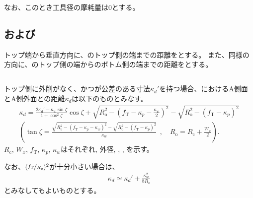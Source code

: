 なお、このとき工具径の摩耗量は0とする。


\subsection{\KeywayPos および\KeywayWidth}
トップ端から垂直方向に、\Keyway のトップ側の端までの距離を\KeywayPos とする。
また、同様の方向に、\Keyway のトップ側の端から\Keyway のボトム側の端までの距離を\KeywayWidth とする。


\subsection{\KeywayDepth}
トップ側に外削がなく、かつ\AsideKeywayDepth が公差のある寸法$\kappa_d'$を持つ場合、\KeywayCenter における\Keyway A側面とA側外面との距離$\kappa_d$は以下のものとみなす。
\begin{gather*}
  \kappa_d
  = \frac{2\kappa_d'-\kappa_w\sin\zeta}{1+\cos^2\zeta}\cos\zeta
    +\sqrt{R_\mathrm o^2-\left(f_\mathrm T-\kappa_p-\frac{\kappa_w}2\right)^2}
    -\sqrt{R_\mathrm o^2-\left(f_\mathrm T-\kappa_p\right)^2}\\[3pt]
  \left(
  \tan\zeta
  = \frac{\sqrt{R_\mathrm o^2-\left(f_\mathrm T-\kappa_p-\kappa_w\right)^2}
          -\sqrt{R_\mathrm o^2-\left(f_\mathrm T-\kappa_p\right)^2}}
         {\kappa_w}
    ~~, \quad
    R_\mathrm o = R_\mathrm c+\frac{W_x}2
  \right).
\end{gather*}
$R_\mathrm c$, $W_x$, $f_\mathrm T$, $\kappa_p$, $\kappa_w$はそれぞれ\CenterCurvatureRadius, 外径, \TopAlocationLength, \KeywayPos, \KeywayWidth を示す。

なお、$(\nicefrac{f_\mathrm T}{R_\mathrm c})^2$が十分小さい場合は、
\begin{align*}
  \kappa_d \simeq \kappa_d'+\frac{\kappa_w^2}{8R_\mathrm o}
\end{align*}
とみなしてもよいものとする。



\clearpage


